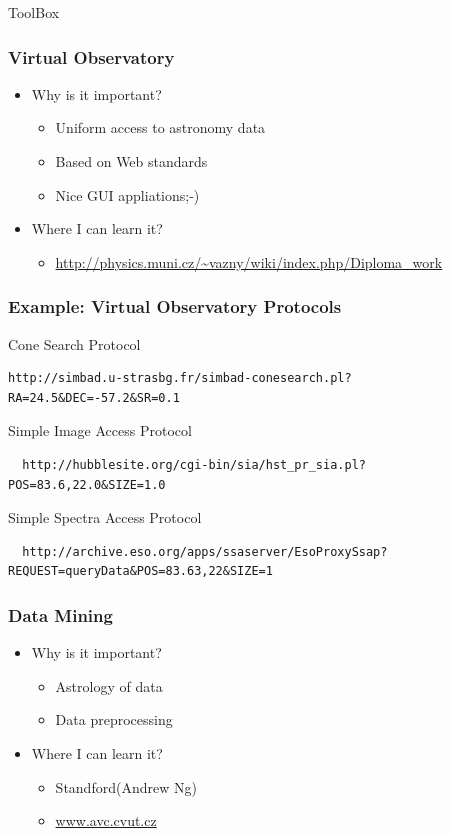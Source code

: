 \documentclass[fleqn]{beamer}
\begin{document}
\begin{section}{ToolBox}
\begin{frame}[containsverbatim]
\end{frame}


  \begin{frame}\frametitle{Virtual Observatory}
  \begin{itemize}
    \item{Why is it important?}
      \begin{itemize}
        \item Uniform access to astronomy data
        \item Based on Web standards
        \item Nice GUI appliations;-)
      \end{itemize}
    \item{Where I can learn it?}
      \begin{itemize}
       \item \url{http://physics.muni.cz/~vazny/wiki/index.php/Diploma_work}
      \end{itemize}
  \end{itemize}
  \end{frame}



\begin{frame}[containsverbatim]\frametitle{Example: Virtual
    Observatory Protocols}

Cone Search Protocol

\begin{lstlisting}
http://simbad.u-strasbg.fr/simbad-conesearch.pl?RA=24.5&DEC=-57.2&SR=0.1
\end{lstlisting}


Simple Image Access Protocol

\begin{lstlisting}
  http://hubblesite.org/cgi-bin/sia/hst_pr_sia.pl?POS=83.6,22.0&SIZE=1.0
\end{lstlisting}

Simple Spectra Access Protocol

\begin{lstlisting}
  http://archive.eso.org/apps/ssaserver/EsoProxySsap?REQUEST=queryData&POS=83.63,22&SIZE=1
\end{lstlisting}

\end{frame}

  \begin{frame}\frametitle{Data Mining}
  \begin{itemize}
    \item{Why is it important?}
      \begin{itemize}
      \item Astrology of data
      \item Data preprocessing
      \end{itemize}
    \item{Where I can learn it?}
      \begin{itemize}
      \item {Standford(Andrew Ng)}
      \item {\url{www.avc.cvut.cz}}
      \end{itemize}
  \end{itemize}
  \end{frame}


\end{section}
\end{document}
